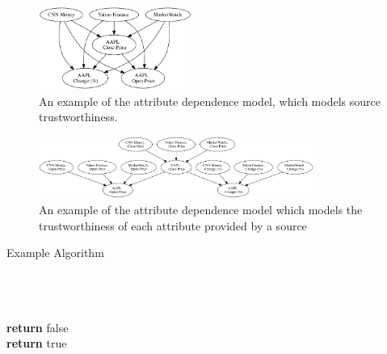 \documentclass{acm_proc_article-sp}
\begin{document}
\begin{figure}
\centering
\includegraphics[width=5cm]{bn1.png}
\caption{An example of the attribute dependence model, which models source trustworthiness.}
\end{figure}

\begin{figure}
\centering
\includegraphics[width=9cm]{bn2.png}
\caption{An example of the attribute dependence model which models the trustworthiness of each attribute provided by a source}
\end{figure}

\begin{algorithm}[H]
\caption{Example Algorithm}
\begin{algorithmic}[1]
 \\
 \\
 \\


\State \textbf{return} false
\EndIf
\EndFor
\\

\State \textbf{return} true
\EndFunction
\end{algorithmic}
\end{algorithm}  



  

\balancecolumns
\end{document}
